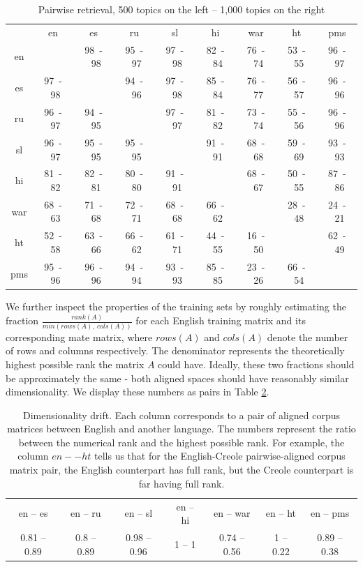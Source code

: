 {
\renewcommand\tabcolsep{3pt}
\begin{table}[h!]
\caption{Pairwise retrieval, 500 topics on the left -- 1,000 topics on the right}\label{table:retrieval}
\begin{center}
\begin{tabular}{|c|c|c|c|c|c|c|c|c|}
\cline{1-9}
&	en&	es&	ru&	sl&	hi&	war&	ht&	pms\\\cline{1-9}
en&	    &	98~-~98&	95~-~97&	97~-~98&	82~-~84&	76~-~74&	53~-~55&	 96~-~97\\
\cline{1-9}
es&	97~-~98&	&	94~-~96&	97~-~98&	85~-~84&	76~-~77&	56~-~57&	96~-~96\\
\cline{1-9}
ru&	96~-~97&	94~-~95&	&	97~-~97&	81~-~82&	73~-~74&	55~-~56&	96~-~96\\
\cline{1-9}
sl&	96~-~97&	95~-~95&	95~-~95&	&	91~-~91&	68~-~68&	59~-~69&	93~-~93\\
\cline{1-9}
hi&	81~-~82&	82~-~81&	80~-~80&	91~-~91&	&	68~-~67&	50~-~55&	87~-~86\\
\cline{1-9}
war&	68~-~63&	71~-~68&	72~-~71&	68~-~68&	66~-~62&	&	28~-~48&	 24~-~21\\
\cline{1-9}
ht&	52~-~58&	63~-~66&	66~-~62&	61~-~71&	44~-~55&	16~-~50&	&	62~-~49\\
\cline{1-9}
pms&	95~-~96&	96~-~96&	94~-~94&	93~-~93&	85~-~85&	23~-~26&	66~-~54&	 \\
\cline{1-9}
\end{tabular}
\end{center}
\end{table}
}

We further inspect the properties of the training sets by roughly estimating the fraction $\frac{rank(A)}{min\left(rows\left(A\right),~cols\left(A\right)\right)}$ for each English training matrix and its corresponding mate matrix, where $rows(A)$ and $cols(A)$ denote the number of rows and columns respectively. The denominator represents the theoretically highest possible rank the matrix $A$ could have. Ideally, these two fractions should be approximately the same - both aligned spaces should have reasonably similar dimensionality. We display these numbers as pairs in Table \ref{table:rank}.

\begin{table}[h]
\caption{Dimensionality drift. Each column corresponds to a pair of aligned corpus matrices between English and another language. The numbers represent the ratio between the numerical rank and the highest possible rank. For example, the column $en -- ht$ tells us that for the English-Creole pairwise-aligned corpus matrix pair, the English counterpart has full rank, but the Creole counterpart is far having full rank.}
\label{table:rank}
\begin{tabular}{|c|c|c|c|c|c|c|}
\cline{1-7}
en -- es     &   en -- ru     &   en -- sl       &     en -- hi &   en -- war      &      en -- ht &   en -- pms\\
\cline{1-7}
0.81 -- 0.89   &  0.8 -- 0.89  &   0.98 -- 0.96    &    1 -- 1  &  0.74 -- 0.56  &      1 -- 0.22  &   0.89 -- 0.38\\
\cline{1-7}
\end{tabular}
\end{table}


